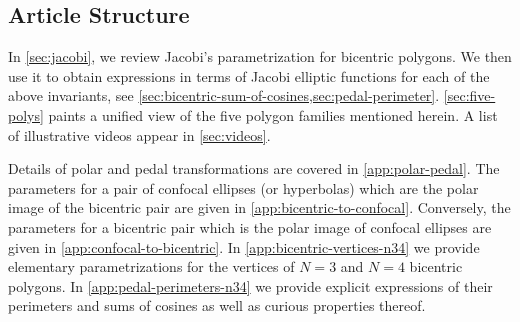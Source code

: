 


\subsection*{Article Structure}
In \cref{sec:jacobi}, we review Jacobi's parametrization for bicentric polygons. We then use it to obtain expressions in terms of Jacobi elliptic functions for each of the above invariants, see \cref{sec:bicentric-sum-of-cosines,sec:pedal-perimeter}. \cref{sec:five-polys} paints a unified view of the five polygon families mentioned herein. A list of illustrative videos appear in \cref{sec:videos}. 

Details of polar and pedal transformations are covered in \cref{app:polar-pedal}. The parameters for a pair of confocal ellipses (or hyperbolas) which are the polar image of the bicentric pair are given in \cref{app:bicentric-to-confocal}. Conversely, the parameters for a bicentric pair which is the polar image of confocal ellipses are given in
\cref{app:confocal-to-bicentric}. In \cref{app:bicentric-vertices-n34} we provide elementary parametrizations for the vertices of $N=3$ and $N=4$ bicentric polygons. In \cref{app:pedal-perimeters-n34} we provide explicit expressions of their perimeters and sums of cosines as well as curious properties thereof.



